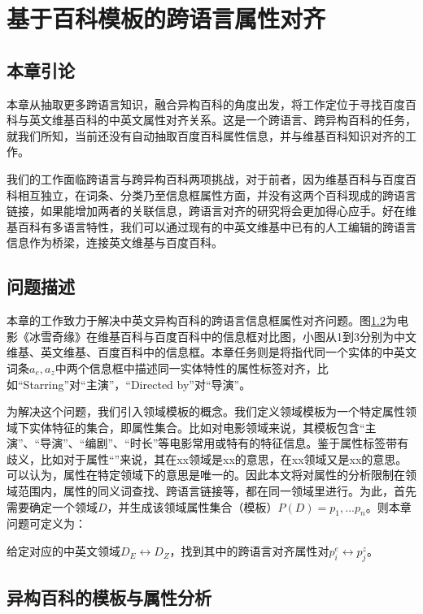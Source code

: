 \chapter{基于百科模板的跨语言属性对齐}
\label{cha:property-matching}

\section{本章引论}
本章从抽取更多跨语言知识，融合异构百科的角度出发，将工作定位于寻找百度百科与英文维基百科的中英文属性对齐关系。这是一个跨语言、跨异构百科的任务，就我们所知，当前还没有自动抽取百度百科属性信息，并与维基百科知识对齐的工作。

我们的工作面临跨语言与跨异构百科两项挑战，对于前者，因为维基百科与百度百科相互独立，在词条、分类乃至信息框属性方面，并没有这两个百科现成的跨语言链接，如果能增加两者的关联信息，跨语言对齐的研究将会更加得心应手。好在维基百科有多语言特性，我们可以通过现有的中英文维基中已有的人工编辑的跨语言信息作为桥梁，连接英文维基与百度百科。

\section{问题描述}
本章的工作致力于解决中英文异构百科的跨语言信息框属性对齐问题。图\ref{}为电影《冰雪奇缘》在维基百科与百度百科中的信息框对比图，小图从1到3分别为中文维基、英文维基、百度百科中的信息框。本章任务则是将指代同一个实体的中英文词条$a_e,a_z$中两个信息框中描述同一实体特性的属性标签对齐，比如“Starring”对“主演”，“Directed by”对“导演”。

为解决这个问题，我们引入{\heiti 领域模板}的概念。我们定义领域模板为一个特定属性领域下实体特征的集合，即属性集合。比如对电影领域来说，其模板包含“主演”、“导演”、“编剧”、“时长”等电影常用或特有的特征信息。鉴于属性标签带有歧义，比如对于属性“”来说，其在xx领域是xx的意思，在xx领域又是xx的意思。可以认为，属性在特定领域下的意思是唯一的。因此本文将对属性的分析限制在领域范围内，属性的同义词查找、跨语言链接等，都在同一领域里进行。为此，首先需要确定一个领域$D$，并生成该领域属性集合（模板）$P(D)={p_1,...p_n}$。则本章问题可定义为：

给定对应的中英文领域$D_E \leftrightarrow D_Z$，找到其中的跨语言对齐属性对$p_i^e \leftrightarrow p_j^z$。

\section{异构百科的模板与属性分析}
\label{sec:template-property-analysis}

